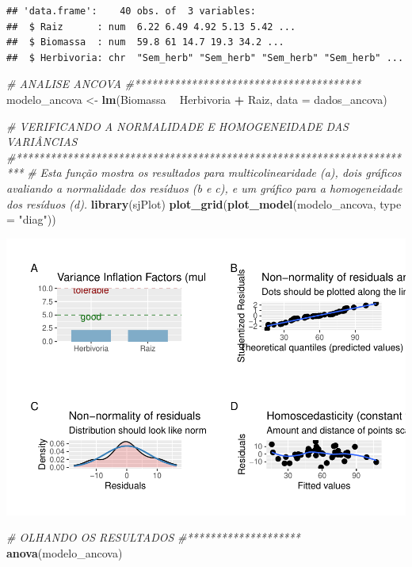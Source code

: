 \documentclass[
]{book}
\newenvironment{Shaded}{\begin{snugshade}}{\end{snugshade}}
\newcommand{\CommentTok}[1]{\textcolor[rgb]{0.56,0.35,0.01}{\textit{#1}}}
\newcommand{\DataTypeTok}[1]{\textcolor[rgb]{0.13,0.29,0.53}{#1}}
\newcommand{\KeywordTok}[1]{\textcolor[rgb]{0.13,0.29,0.53}{\textbf{#1}}}
\newcommand{\NormalTok}[1]{#1}
\newcommand{\OperatorTok}[1]{\textcolor[rgb]{0.81,0.36,0.00}{\textbf{#1}}}
\newcommand{\StringTok}[1]{\textcolor[rgb]{0.31,0.60,0.02}{#1}}
\begin{document}
\begin{verbatim}
## 'data.frame':	40 obs. of  3 variables:
##  $ Raiz      : num  6.22 6.49 4.92 5.13 5.42 ...
##  $ Biomassa  : num  59.8 61 14.7 19.3 34.2 ...
##  $ Herbivoria: chr  "Sem_herb" "Sem_herb" "Sem_herb" "Sem_herb" ...
\end{verbatim}

\begin{Shaded}
\begin{Highlighting}[]
\CommentTok{# ANALISE ANCOVA}
\CommentTok{#****************************************}
\NormalTok{modelo_ancova <-}\StringTok{ }\KeywordTok{lm}\NormalTok{(Biomassa }\OperatorTok{~}\StringTok{ }\NormalTok{Herbivoria }\OperatorTok{+}\StringTok{ }\NormalTok{Raiz, }\DataTypeTok{data =}\NormalTok{ dados_ancova)}

\CommentTok{# VERIFICANDO A NORMALIDADE E HOMOGENEIDADE DAS VARIÂNCIAS}
\CommentTok{#***********************************************************************}
\CommentTok{# Esta função mostra os resultados para multicolinearidade (a), dois gráficos avaliando a normalidade dos resíduos (b e  c), e um gráfico para a homogeneidade dos resíduos (d).}
\KeywordTok{library}\NormalTok{(sjPlot)}
\KeywordTok{plot_grid}\NormalTok{(}\KeywordTok{plot_model}\NormalTok{(modelo_ancova, }\DataTypeTok{type =} \StringTok{"diag"}\NormalTok{))}
\end{Highlighting}
\end{Shaded}

\includegraphics{livro_r_ecologia_files/figure-latex/unnamed-chunk-22-1.pdf}

\begin{Shaded}
\begin{Highlighting}[]
\CommentTok{# OLHANDO OS RESULTADOS}
\CommentTok{#********************}
\KeywordTok{anova}\NormalTok{(modelo_ancova)}
\end{Highlighting}
\end{Shaded}
\end{document}
